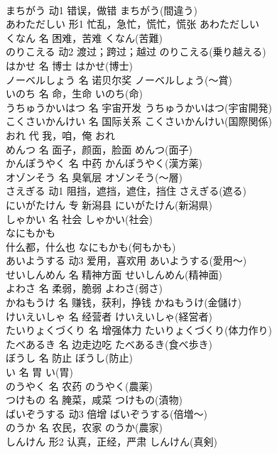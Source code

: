 \documentclass[8pt]{extreport}
\begin{document}
\begin{CJK}{UTF8}{min}
\\	まちがう	动1	错误，做错	まちがう(間違う)	
\\	あわただしい	形1	忙乱，急忙，慌忙，慌张	あわただしい	
\\	くなん	名	困难，苦难	くなん(苦難)	
\\	のりこえる	动2	渡过；跨过；越过	のりこえる(乗り越える)	
\\	はかせ	名	博士	はかせ(博士)	
\\	ノーベルしょう	名	诺贝尔奖	ノーベルしょう(～賞)	
\\	いのち	名	命，生命	いのち(命)	
\\	うちゅうかいはつ	名	宇宙开发	うちゅうかいはつ(宇宙開発)	
\\	こくさいかんけい	名	国际关系	こくさいかんけい(国際関係)	
\\	おれ	代	我，咱，俺	おれ	
\\	めんつ	名	面子，颜面，脸面	めんつ(面子)	
\\	かんぽうやく	名	中药	かんぽうやく(漢方薬)	
\\	オゾンそう	名	臭氧层	オゾンそう(～層)	
\\	さえぎる	动1	阻挡，遮挡，遮住，挡住	さえぎる(遮る)	
\\	にいがたけん	专	新潟县	にいがたけん(新潟県)	
\\	しゃかい	名	社会	しゃかい(社会)	
\\	なにもかも	
\\	什么都，什么也	なにもかも(何もかも)	
\\	あいようする	动3	爱用，喜欢用	あいようする(愛用～)	
\\	せいしんめん	名	精神方面	せいしんめん(精神面)	
\\	よわさ	名	柔弱，脆弱	よわさ(弱さ)	
\\	かねもうけ	名	赚钱，获利，挣钱	かねもうけ(金儲け)	
\\	けいえいしゃ	名	经营者	けいえいしゃ(経営者)	
\\	たいりょくづくり	名	增强体力	たいりょくづくり(体力作り)	
\\	たべあるき	名	边走边吃	たべあるき(食べ歩き)	
\\	ぼうし	名	防止	ぼうし(防止)	
\\	い	名	胃	い(胃)	
\\	のうやく	名	农药	のうやく(農薬)	
\\	つけもの	名	腌菜，咸菜	つけもの(漬物)	
\\	ばいぞうする	动3	倍增	ばいぞうする(倍増～)	
\\	のうか	名	农民，农家	のうか(農家)	
\\	しんけん	形2	认真，正经，严肃	しんけん(真剣)	

\end{CJK}
\end{document}
